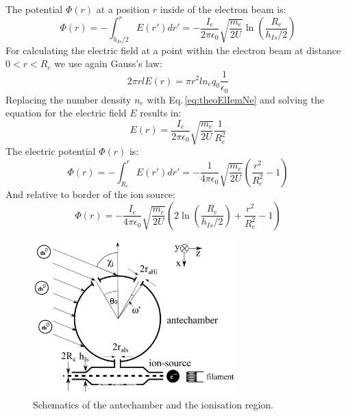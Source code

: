 		The potential $\Phi (r)$ at a position $r$ inside of the electron beam is:
		\begin{equation}
			\Phi (r) = -\int_{h_{Is}/2}^{r} E(r') dr' = -\frac{I_e}{2\pi\epsilon_0}\sqrt{\frac{m_e}{2U}}\ln\left(\frac{R_e}{h_{Is}/2}\right)
		\end{equation}
		For calculating the electric field at a point within the electron beam at distance $0<r<R_e$ we use again Gauss's law:
		\begin{equation}
			2\pi r l E(r) = \pi r^2 l n_e q_0 \frac{1}{\epsilon_0}
		\end{equation}
		Replacing the number density $n_e$ with Eq.\,\eqref{eq:theoElIemNe} and solving the equation for the electric field $E$ results in:
		\begin{equation}
			E(r) = \frac{I_e}{2\pi\epsilon_0}\sqrt{\frac{m_e}{2U}}\frac{1}{R_e^2}
		\end{equation}
		The electric potential $\Phi (r)$ is:
		\begin{equation}
			\Phi (r) = -\int_{R_e}^{r} E(r') dr' = -\frac{1}{4\pi\epsilon_0}\sqrt{\frac{m_e}{2U}}\left(\frac{r^2}{R_e^2} -1 \right)
		\end{equation}
		And relative to border of the ion source:
		\begin{equation}
			\Phi(r) = -\frac{I_e}{4\pi\epsilon_0}\sqrt{\frac{m_e}{2U}}\left(2\ln\left(\frac{R_e}{h_{Is}/2}\right) +\frac{r^2}{R_e^2} -1 \right)
			\label{eq:elPotIem}
		\end{equation}
	
		\begin{figure}[h]
			\centering
			\includegraphics[width= 0.7\textwidth]{Bilder/particleDensEnh.png}
			\caption{Schematics of the antechamber and the ionisation region.}
			\label{fig:thAntIs}
		\end{figure}

